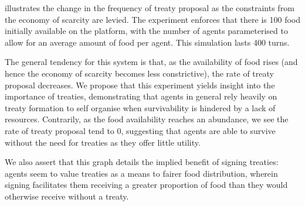  illustrates the change in the frequency of treaty proposal as the constraints from the economy of scarcity are levied. The experiment enforces that there is 100 food initially available on the platform, with the number of agents parameterised to allow for an average amount of food per agent. This simulation lasts 400 turns.

The general tendency for this system is that, as the availability of food rises (and hence the economy of scarcity becomes less constrictive), the rate of treaty proposal decreases. We propose that this experiment yields insight into the importance of treaties, demonstrating that agents in general rely heavily on treaty formation to self organise when survivability is hindered by a lack of resources. Contrarily, as the food availability reaches an abundance, we see the rate of treaty proposal tend to 0, suggesting that agents are able to survive without the need for treaties as they offer little utility.

We also assert that this graph details the implied benefit of signing treaties: agents seem to value treaties as a means to fairer food distribution, wherein signing facilitates them receiving a greater proportion of food than they would otherwise receive without a treaty.

